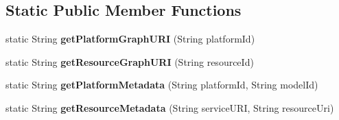 \subsection*{Static Public Member Functions}
\begin{DoxyCompactItemize}
\item 
static String {\bfseries get\+Platform\+Graph\+U\+RI} (String platform\+Id)\hypertarget{classeu_1_1h2020_1_1symbiote_1_1ontology_1_1model_1_1Ontology_aa76aa8cf3ce95ab4e6d7ba8a7e716aef}{}\label{classeu_1_1h2020_1_1symbiote_1_1ontology_1_1model_1_1Ontology_aa76aa8cf3ce95ab4e6d7ba8a7e716aef}

\item 
static String {\bfseries get\+Resource\+Graph\+U\+RI} (String resource\+Id)\hypertarget{classeu_1_1h2020_1_1symbiote_1_1ontology_1_1model_1_1Ontology_a986882538f6fea21309f7334418d17dc}{}\label{classeu_1_1h2020_1_1symbiote_1_1ontology_1_1model_1_1Ontology_a986882538f6fea21309f7334418d17dc}

\item 
static String {\bfseries get\+Platform\+Metadata} (String platform\+Id, String model\+Id)\hypertarget{classeu_1_1h2020_1_1symbiote_1_1ontology_1_1model_1_1Ontology_a9c5bddffb57bbae8395a2ac9059f8475}{}\label{classeu_1_1h2020_1_1symbiote_1_1ontology_1_1model_1_1Ontology_a9c5bddffb57bbae8395a2ac9059f8475}

\item 
static String {\bfseries get\+Resource\+Metadata} (String service\+U\+RI, String resource\+Uri)\hypertarget{classeu_1_1h2020_1_1symbiote_1_1ontology_1_1model_1_1Ontology_a34a0c58bdf9fa8f3d7b3f95124e9a97f}{}\label{classeu_1_1h2020_1_1symbiote_1_1ontology_1_1model_1_1Ontology_a34a0c58bdf9fa8f3d7b3f95124e9a97f}

\end{DoxyCompactItemize}
